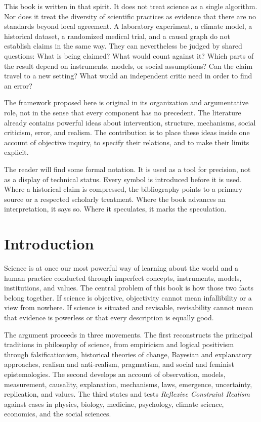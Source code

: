 \documentclass[11pt,openright]{book}
\begin{document}
This book is written in that spirit. It does not treat science as a single
algorithm. Nor does it treat the diversity of scientific practices as evidence
that there are no standards beyond local agreement. A laboratory experiment, a
climate model, a historical dataset, a randomized medical trial, and a causal
graph do not establish claims in the same way. They can nevertheless be judged
by shared questions: What is being claimed? What would count against it? Which
parts of the result depend on instruments, models, or social assumptions? Can
the claim travel to a new setting? What would an independent critic need in
order to find an error?

The framework proposed here is original in its organization and argumentative
role, not in the sense that every component has no precedent. The literature
already contains powerful ideas about intervention, structure, mechanisms,
social criticism, error, and realism. The contribution is to place these ideas
inside one account of objective inquiry, to specify their relations, and to
make their limits explicit.

The reader will find some formal notation. It is used as a tool for precision,
not as a display of technical status. Every symbol is introduced before it is
used. Where a historical claim is compressed, the bibliography points to a
primary source or a respected scholarly treatment. Where the book advances an
interpretation, it says so. Where it speculates, it marks the speculation.

\chapter*{Introduction}
Science is at once our most powerful way of learning about the world and a
human practice conducted through imperfect concepts, instruments, models,
institutions, and values. The central problem of this book is how those two
facts belong together. If science is objective, objectivity cannot mean
infallibility or a view from nowhere. If science is situated and revisable,
revisability cannot mean that evidence is powerless or that every description
is equally good.

The argument proceeds in three movements. The first reconstructs the principal
traditions in philosophy of science, from empiricism and logical positivism
through falsificationism, historical theories of change, Bayesian and
explanatory approaches, realism and anti-realism, pragmatism, and social and
feminist epistemologies. The second develops an account of observation,
models, measurement, causality, explanation, mechanisms, laws, emergence,
uncertainty, replication, and values. The third states and tests
\emph{Reflexive Constraint Realism} against cases in physics, biology,
medicine, psychology, climate science, economics, and the social sciences.
\end{document}
